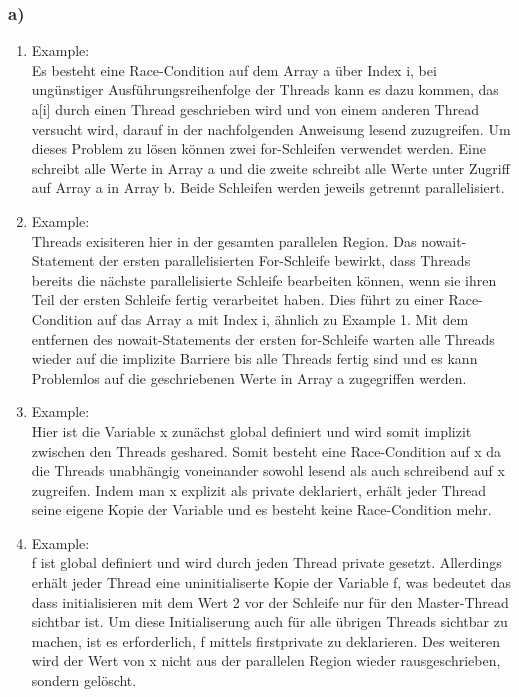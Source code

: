 \documentclass{article}
\begin{document}
    	\subsubsection{a)}
		\begin{enumerate}
			\item Example: \\
				Es besteht eine Race-Condition auf dem Array a über Index i,
				bei ungünstiger Ausführungsreihenfolge der Threads kann es dazu kommen,
				das a[i] durch einen Thread geschrieben wird und von einem anderen Thread versucht wird, darauf in der nachfolgenden Anweisung lesend zuzugreifen.
				Um dieses Problem zu lösen können zwei for-Schleifen verwendet werden.
				Eine schreibt alle Werte in Array a und die zweite schreibt alle Werte unter Zugriff auf Array a in Array b. 
				Beide Schleifen werden jeweils getrennt parallelisiert.
			\item Example: \\
				Threads exisiteren hier in der gesamten parallelen Region.
				Das nowait-Statement der ersten parallelisierten For-Schleife bewirkt, dass Threads bereits die nächste parallelisierte Schleife bearbeiten können, wenn sie ihren Teil der ersten Schleife fertig verarbeitet haben.
				Dies führt zu einer Race-Condition auf das Array a mit Index i, ähnlich zu Example 1.
				Mit dem entfernen des nowait-Statements der ersten for-Schleife warten alle Threads wieder auf die implizite Barriere bis alle Threads fertig sind und es kann Problemlos auf die geschriebenen Werte in Array a zugegriffen werden.
			\item Example: \\
				Hier ist die Variable x zunächst global definiert und wird somit implizit zwischen den Threads geshared. 
				Somit besteht eine Race-Condition auf x da die Threads unabhängig voneinander sowohl lesend als auch schreibend auf x zugreifen.
				Indem man x explizit als private deklariert, erhält jeder Thread seine eigene Kopie der Variable und es besteht keine Race-Condition mehr.
			\item Example: \\
				f ist global definiert und wird durch jeden Thread private gesetzt. 
				Allerdings erhält jeder Thread eine uninitialiserte Kopie der Variable f, was bedeutet das dass initialisieren mit dem Wert 2 vor der Schleife nur für den Master-Thread sichtbar ist.
				Um diese Initialiserung auch für alle übrigen Threads sichtbar zu machen, ist es erforderlich, f mittels firstprivate zu deklarieren.
				Des weiteren wird der Wert von x nicht aus der parallelen Region wieder rausgeschrieben, sondern gelöscht. 

\end{enumerate}
\end{document}
